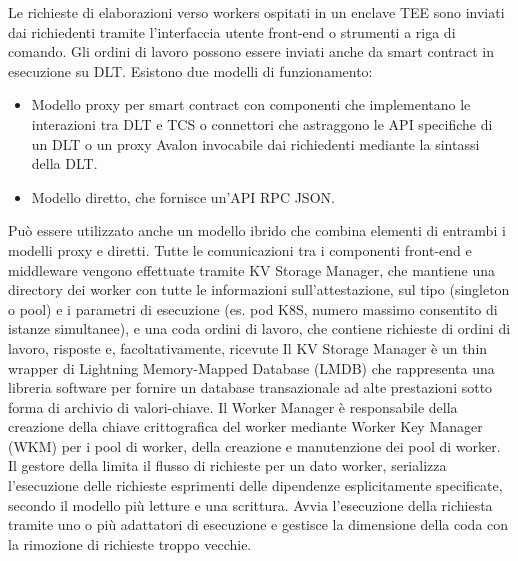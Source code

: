 Le richieste di elaborazioni verso workers ospitati in un enclave TEE
sono inviati dai richiedenti tramite l'interfaccia utente front-end o
strumenti a riga di comando. Gli ordini di lavoro possono essere
inviati anche da smart contract in esecuzione su DLT. Esistono due
modelli di funzionamento:
\begin{itemize}
    \item Modello proxy per smart contract con componenti che
implementano le interazioni tra DLT e TCS o
connettori che astraggono le API specifiche di
un DLT o un proxy
Avalon invocabile dai
richiedenti mediante la
sintassi della DLT.
    \item Modello diretto, che fornisce un'API RPC JSON.
\end{itemize}
Può essere utilizzato
anche un modello ibrido
che combina elementi di
entrambi i modelli proxy
e diretti. Tutte le comunicazioni tra i componenti front-end e middleware vengono effettuate tramite
KV Storage Manager, che mantiene una directory dei worker con tutte le informazioni sull'attestazione, sul tipo (singleton o
pool) e i parametri di esecuzione (es. pod K8S, numero massimo consentito di istanze
simultanee), e una coda ordini di lavoro, che contiene richieste di ordini di lavoro, risposte e,
facoltativamente, ricevute
Il KV Storage Manager è un thin wrapper di Lightning Memory-Mapped Database (LMDB) che
rappresenta una libreria software per fornire un database transazionale ad alte prestazioni
sotto forma di archivio di valori-chiave. Il Worker Manager è
responsabile della creazione
della chiave crittografica del
worker mediante Worker Key
Manager (WKM) per i pool di
worker, della creazione e
manutenzione dei pool di
worker. Il gestore della limita il flusso di richieste per un dato
worker, serializza l'esecuzione delle richieste esprimenti
delle dipendenze esplicitamente specificate, secondo il
modello più letture e una scrittura. Avvia l'esecuzione
della richiesta tramite uno o più adattatori di esecuzione
e gestisce la dimensione della coda con la rimozione di
richieste troppo vecchie. 

